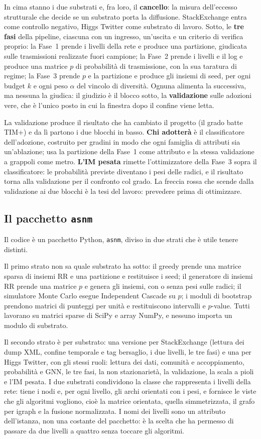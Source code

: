 \documentclass[11pt,a4paper]{article}
\newcommand{\sx}{StackExchange}
\newcommand{\hg}{Higgs Twitter}
\begin{document}
In cima stanno i due substrati e, fra loro, il \textbf{cancello}: la misura dell'eccesso strutturale che decide se un substrato porta la diffusione. \sx{} entra come controllo negativo, \hg{} come substrato di lavoro. Sotto, le \textbf{tre fasi} della pipeline, ciascuna con un ingresso, un'uscita e un criterio di verifica proprio: la Fase~1 prende i livelli della rete e produce una partizione, giudicata sulle trasmissioni realizzate fuori campione; la Fase~2 prende i livelli e il log e produce una matrice $p$ di probabilità di trasmissione, con la sua taratura di regime; la Fase~3 prende $p$ e la partizione e produce gli insiemi di seed, per ogni budget $k$ e ogni peso $\alpha$ del vincolo di diversità. Ognuna alimenta la successiva, ma nessuna la giudica: il giudizio è il blocco sotto, la \textbf{validazione} sulle adozioni vere, che è l'unico posto in cui la finestra dopo il confine viene letta.

La validazione produce il risultato che ha cambiato il progetto (il grado batte TIM+) e da lì partono i due blocchi in basso. \textbf{Chi adotterà} è il classificatore dell'adozione, costruito per gradini in modo che ogni famiglia di attributi sia un'ablazione; usa la partizione della Fase~1 come attributo e la stessa validazione a grappoli come metro. \textbf{L'IM pesata} rimette l'ottimizzatore della Fase~3 sopra il classificatore: le probabilità previste diventano i pesi delle radici, e il risultato torna alla validazione per il confronto col grado. La freccia rossa che scende dalla validazione ai due blocchi è la tesi del lavoro: prevedere prima di ottimizzare.

\subsection{Il pacchetto \texttt{asnm}}
Il codice è un pacchetto Python, \texttt{asnm}, diviso in due strati che è utile tenere distinti.

Il primo strato non sa quale substrato ha sotto: il greedy prende una matrice sparsa di insiemi RR e una partizione e restituisce i seed; il generatore di insiemi RR prende una matrice $p$ e genera gli insiemi, con o senza pesi sulle radici; il simulatore Monte Carlo esegue Independent Cascade su $p$; i moduli di bootstrap prendono matrici di punteggi per unità e restituiscono intervalli e $p$-value. Tutti lavorano su matrici sparse di SciPy e array NumPy, e nessuno importa un modulo di substrato.

Il secondo strato è per substrato: una versione per \sx{} (lettura dei dump XML, confine temporale e tag bersaglio, i due livelli, le tre fasi) e una per \hg{}, con gli stessi ruoli: lettura dei dati, comunità e accoppiamento, probabilità e GNN, le tre fasi, la non stazionarietà, la validazione, la scala a pioli e l'IM pesata. I due substrati condividono la classe che rappresenta i livelli della rete: tiene i nodi e, per ogni livello, gli archi orientati con i pesi, e fornisce le viste che gli algoritmi vogliono, cioè la matrice orientata, quella simmetrizzata, il grafo per igraph e la fusione normalizzata. I nomi dei livelli sono un attributo dell'istanza, non una costante del pacchetto: è la scelta che ha permesso di passare da due livelli a quattro senza toccare gli algoritmi.
\end{document}
